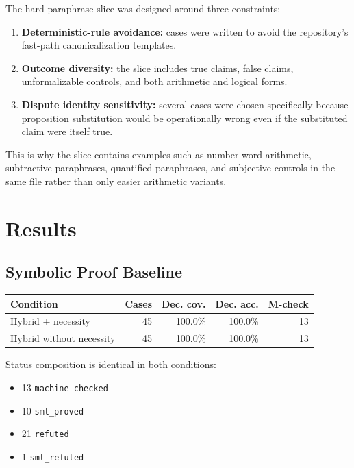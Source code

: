 \documentclass[11pt]{article}
\begin{document}
The hard paraphrase slice was designed around three constraints:

\begin{enumerate}
  \item \textbf{Deterministic-rule avoidance:} cases were written to avoid the
  repository's fast-path canonicalization templates.
  \item \textbf{Outcome diversity:} the slice includes true claims, false
  claims, unformalizable controls, and both arithmetic and logical forms.
  \item \textbf{Dispute identity sensitivity:} several cases were chosen
  specifically because proposition substitution would be operationally wrong
  even if the substituted claim were itself true.
\end{enumerate}

This is why the slice contains examples such as number-word arithmetic,
subtractive paraphrases, quantified paraphrases, and subjective controls in the
same file rather than only easier arithmetic variants.

\section{Results}

\subsection{Symbolic Proof Baseline}

\begin{center}
\footnotesize
\begin{tabular}{lrrrr}
\toprule
\textbf{Condition} & \textbf{Cases} & \textbf{Dec. cov.} & \textbf{Dec. acc.} & \textbf{M-check} \\
\midrule
Hybrid + necessity & 45 & 100.0\% & 100.0\% & 13 \\
Hybrid without necessity & 45 & 100.0\% & 100.0\% & 13 \\
\bottomrule
\end{tabular}
\normalsize
\end{center}

Status composition is identical in both conditions:

\begin{itemize}
  \item 13 \texttt{machine\_checked}
  \item 10 \texttt{smt\_proved}
  \item 21 \texttt{refuted}
  \item 1 \texttt{smt\_refuted}
\end{itemize}
\end{document}
